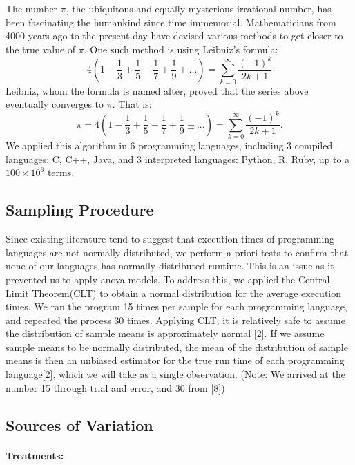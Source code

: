 \documentclass[12pt,halfline,a4paper,]{ouparticle}
\begin{document}
The number \(\pi\), the ubiquitous and equally mysterious irrational
number, has been fascinating the humankind since time immemorial.
Mathematicians from 4000 years ago to the present day have devised
various methods to get closer to the true value of \(\pi\). One such
method is using Leibniz's formula: \[
4 \left( 1 - \frac{1}{3} + \frac{1}{5} - \frac{1}{7} + \frac{1}{9} ±... \right) = \sum_{k=0}^{\infty}\frac{(-1)^k}{2k+1}
\] Leibniz, whom the formula is named after, proved that the series
above eventually converges to \(\pi\). That is: \[
\pi = 4 \left( 1 - \frac{1}{3} + \frac{1}{5} - \frac{1}{7} + \frac{1}{9} ±... \right) = \sum_{k=0}^{\infty}\frac{(-1)^k}{2k+1}.
\] We applied this algorithm in 6 programming languages, including 3
compiled languages: C, C++, Java, and 3 interpreted languages: Python,
R, Ruby, up to a \(100 \times 10^6\) terms.

\hypertarget{sampling-procedure}{%
\subsection{Sampling Procedure}\label{sampling-procedure}}

Since existing literature tend to suggest that execution times of
programming languages are not normally distributed, we perform a priori
tests to confirm that none of our languages has normally distributed
runtime. This is an issue as it prevented us to apply anova models. To
address this, we applied the Central Limit Theorem(CLT) to obtain a
normal distribution for the average execution times. We ran the program
15 times per sample for each programming language, and repeated the
process 30 times. Applying CLT, it is relatively safe to assume the
distribution of sample means is approximately normal {[}2{]}. If we
assume sample means to be normally distributed, the mean of the
distribution of sample means is then an unbiased estimator for the true
run time of each programming language{[}2{]}, which we will take as a
single observation. (Note: We arrived at the number 15 through trial and
error, and 30 from {[}8{]})

\hypertarget{sources-of-variation}{%
\subsection{Sources of Variation}\label{sources-of-variation}}

\hypertarget{treatments}{%
\paragraph{Treatments:}\label{treatments}}
\end{document}
